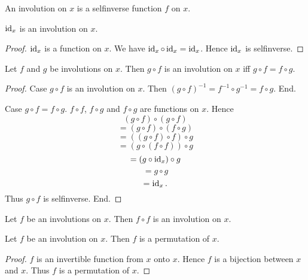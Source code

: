 \documentclass[../../set-theory.tex]{subfiles}
\begin{document}
  \begin{forthel}
    \begin{definition}
      An involution on $x$ is a selfinverse function $f$ on $x$.
    \end{definition}

    \begin{proposition}\label{SetTheory_02_03_305935}
      $\operatorname{id}_{x}$ is an involution on $x$.
    \end{proposition}
    \begin{proof}
      $\operatorname{id}_{x}$ is a function on $x$.
      We have $\operatorname{id}_{x} \circ \operatorname{id}_{x} = \operatorname{id}_{x}$.
      Hence $\operatorname{id}_{x}$ is selfinverse.
    \end{proof}

    \begin{proposition}\label{SetTheory_02_03_610247}
      Let $f$ and $g$ be involutions on $x$.
      Then $g \circ f$ is an involution on $x$ iff $g \circ f = f \circ g$.
    \end{proposition}
    \begin{proof}
      Case $g \circ f$ is an involution on $x$.
        Then $(g \circ f)^{-1} = f^{-1} \circ g^{-1} = f \circ g$.
      End.

      Case $g \circ f = f \circ g$.
        $f \circ f$, $f \circ g$ and $f \circ g$ are functions on $x$.
        Hence
        \[   (g \circ f) \circ (g \circ f) \]
        \[ = (g \circ f) \circ (f \circ g) \]
        \[ = ((g \circ f) \circ f) \circ g \]
        \[ = (g \circ (f \circ f)) \circ g \]
        \[ = (g \circ \operatorname{id}_{x}) \circ g \]
        \[ = g \circ g \]
        \[ = \operatorname{id}_{x}. \]
        Thus $g \circ f$ is selfinverse.
      End.
    \end{proof}

    \begin{corollary}\label{SetTheory_02_03_310947}
      Let $f$ be an involutions on $x$.
      Then $f \circ f$ is an involution on $x$.
    \end{corollary}

    \begin{proposition}\label{SetTheory_02_03_280184}
      Let $f$ be an involution on $x$.
      Then $f$ is a permutation of $x$.
    \end{proposition}
    \begin{proof}
      $f$ is an invertible function from $x$ onto $x$.
      Hence $f$ is a bijection between $x$ and $x$.
      Thus $f$ is a permutation of $x$.
    \end{proof}
  \end{forthel}
\end{document}
